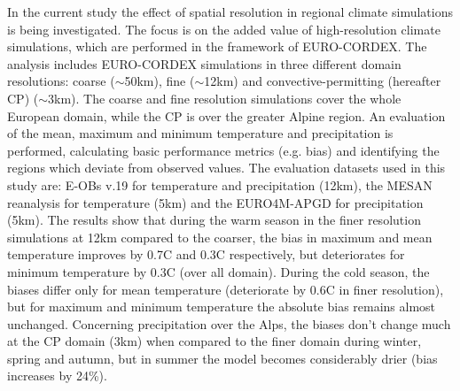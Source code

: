 \documentclass[greek,12pt]{report}
\begin{document}
In the current study the effect of spatial resolution in regional climate simulations is being investigated. The focus is on the added value of high-resolution climate simulations, which are performed in the framework of EURO-CORDEX. The analysis includes EURO-CORDEX simulations in three different domain resolutions: coarse ($\sim$50km), fine ($\sim$12km) and convective-permitting (hereafter CP) ($\sim$3km). The coarse and fine resolution simulations cover the whole European domain, while the CP is over the greater Alpine region.
An evaluation of the mean, maximum and minimum temperature and precipitation is performed, calculating basic performance metrics (e.g. bias) and identifying the regions which deviate from observed values. The evaluation datasets used in this study are: E-OBs v.19 for temperature and precipitation (12km), the MESAN reanalysis for temperature (5km) and the EURO4M-APGD for precipitation (5km).
The results show that during the warm season in the finer resolution simulations at 12km compared to the coarser, the bias in maximum and mean temperature improves by 0.7\degree C and 0.3\degree C respectively, but deteriorates for minimum temperature by 0.3\degree C (over all domain). During the cold season, the biases differ only for mean temperature (deteriorate by 0.6\degree C in finer resolution), but for maximum and minimum temperature the absolute bias remains almost unchanged.
Concerning precipitation over the Alps, the biases don't change much at the CP domain (3km) when compared to the finer domain during winter, spring and autumn, but in summer the model becomes considerably drier (bias increases by 24\%).
\end{document}
